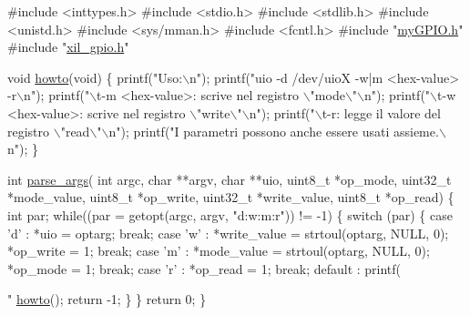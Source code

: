 \begin{DoxyCodeInclude}

\textcolor{preprocessor}{#include <inttypes.h>}
\textcolor{preprocessor}{#include <stdio.h>}
\textcolor{preprocessor}{#include <stdlib.h>}
\textcolor{preprocessor}{#include <unistd.h>}
\textcolor{preprocessor}{#include <sys/mman.h>}
\textcolor{preprocessor}{#include <fcntl.h>}
\textcolor{preprocessor}{#include "\hyperlink{my_g_p_i_o_8h}{myGPIO.h}"}
\textcolor{preprocessor}{#include "\hyperlink{xil__gpio_8h}{xil\_gpio.h}"}

\textcolor{keywordtype}{void} \hyperlink{uio-int_8c_a05909651fa170a63e98e3f8e13451b7b}{howto}(\textcolor{keywordtype}{void}) \{
    printf(\textcolor{stringliteral}{"Uso:\(\backslash\)n"});
    printf(\textcolor{stringliteral}{"uio -d /dev/uioX -w|m <hex-value> -r\(\backslash\)n"});
    printf(\textcolor{stringliteral}{"\(\backslash\)t-m <hex-value>: scrive nel registro \(\backslash\)"mode\(\backslash\)"\(\backslash\)n"});
    printf(\textcolor{stringliteral}{"\(\backslash\)t-w <hex-value>: scrive nel registro \(\backslash\)"write\(\backslash\)"\(\backslash\)n"});
    printf(\textcolor{stringliteral}{"\(\backslash\)t-r: legge il valore del registro \(\backslash\)"read\(\backslash\)"\(\backslash\)n"});
    printf(\textcolor{stringliteral}{"I parametri possono anche essere usati assieme.\(\backslash\)n"});
\}


\textcolor{keywordtype}{int} \hyperlink{uio-int_8c_ab6b18eb1bf7bc996599c06dc6dad8f53}{parse\_args}(   \textcolor{keywordtype}{int}         argc,
                \textcolor{keywordtype}{char}        **argv,
                \textcolor{keywordtype}{char}        **uio,
                uint8\_t     *op\_mode,
                uint32\_t    *mode\_value,
                uint8\_t     *op\_write,
                uint32\_t    *write\_value,
                uint8\_t     *op\_read)
\{
    \textcolor{keywordtype}{int} par;
    \textcolor{keywordflow}{while}((par = getopt(argc, argv, \textcolor{stringliteral}{"d:w:m:r"})) != -1) \{
        \textcolor{keywordflow}{switch} (par) \{
        \textcolor{keywordflow}{case} \textcolor{charliteral}{'d'} :
            *uio = optarg;
            \textcolor{keywordflow}{break};
        \textcolor{keywordflow}{case} \textcolor{charliteral}{'w'} :
            *write\_value = strtoul(optarg, NULL, 0);
            *op\_write = 1;
            \textcolor{keywordflow}{break};
        \textcolor{keywordflow}{case} \textcolor{charliteral}{'m'} :
            *mode\_value = strtoul(optarg, NULL, 0);
            *op\_mode = 1;
            \textcolor{keywordflow}{break};
        \textcolor{keywordflow}{case} \textcolor{charliteral}{'r'} :
            *op\_read = 1;
            \textcolor{keywordflow}{break};
        default :
            printf(\textcolor{stringliteral}{"%
            \hyperlink{uio-int_8c_a05909651fa170a63e98e3f8e13451b7b}{howto}();
            \textcolor{keywordflow}{return} -1;
        \}
    \}
    \textcolor{keywordflow}{return} 0;
\}


}
\end{DoxyCodeInclude}
